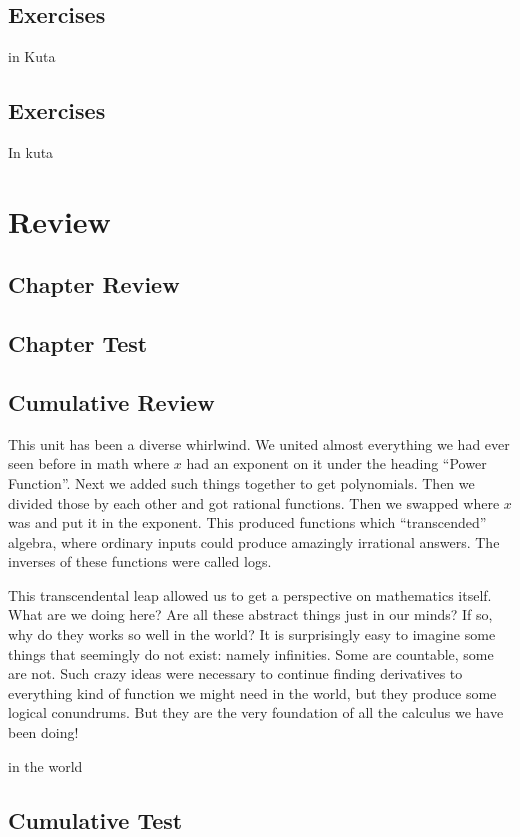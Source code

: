 \subsection{Exercises}
in Kuta


\newpage
{}
\newpage

\newpage
\subsection{Exercises}
In kuta




\newpage
\section{Review}
\subsection{Chapter Review}
\subsection{Chapter Test}
\subsection{Cumulative Review}
This unit has been a diverse whirlwind.  We united almost everything we had ever seen
before in math where $x$ had an exponent on it under the heading ``Power Function''.
Next we added such things together to get polynomials.  Then we divided those by each
other and got rational functions.  Then we swapped where $x$ was and put it in the
exponent.  This produced functions which ``transcended'' algebra, where ordinary inputs
could produce amazingly irrational answers.  The inverses of these functions were called
logs.

This transcendental leap allowed us to get a perspective on mathematics itself.  What 
are we doing here?  Are all these abstract things just in our minds?  If so, why do they 
works so well in the world?  It is surprisingly easy to imagine some things that 
seemingly do not exist: namely infinities.  Some are countable, some are not.  Such
crazy ideas were necessary to continue finding derivatives to everything kind of function
we might need in the world, but they produce some logical conundrums.   But they
are the very foundation of all the calculus we have been doing!

in the world
\subsection{Cumulative Test}